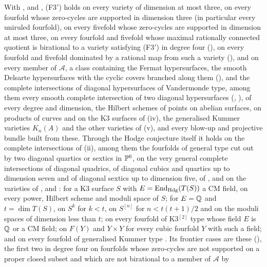 \begin{remark}\label{rem:f3primefrontier}
With ,  and ,
\textup{(F3$'$)} holds on every variety of dimension at most three, on every
fourfold whose zero-cycles are supported in dimension three (in particular
every uniruled fourfold), on every fivefold whose zero-cycles are supported
in dimension at most three, on every fourfold and fivefold whose maximal
rationally connected quotient is birational to a variety satisfying
\textup{(F3$'$)} in degree four (), on every
fourfold and fivefold dominated by a rational map from such a variety
(), and on
every member of $\mathcal{A}$, a class containing the Fermat
hypersurfaces, the smooth Delsarte hypersurfaces with the cyclic covers
branched along them (), and the complete intersections
of diagonal hypersurfaces of Vandermonde type, among them every smooth
complete intersection of two diagonal hypersurfaces (,
), of every degree and dimension, the Hilbert schemes of points on
abelian surfaces, on products of curves and on the K3 surfaces of
(iv), the generalised Kummer varieties $K_{n}(A)$ and the
other varieties of (v), and every blow-up and projective bundle
built from these. Through the Hodge conjecture itself it holds on the
complete intersections of (ii), among them the
fourfolds of general type cut out by two diagonal quartics or sextics in
$\mathbb{P}^{6}$, on the very general complete intersections of diagonal quadrics,
of diagonal cubics and quartics up to dimension seven and of diagonal
sextics up to dimension five, of , and on the
varieties of ,  and
: for a K3 surface $S$ with
$E=\operatorname{End}_{\mathrm{Hdg}}(T(S))$ a CM field, on every power, Hilbert scheme and
moduli space of $S$; for $E=\mathbb{Q}$ and $t=\dim T(S)$, on $S^{k}$ for $k<t$, on
$S^{[n]}$ for $n<t(t+1)/2$ and on the moduli spaces of dimension less than
$t$; on every fourfold of K3$^{[2]}$ type whose field $E$ is $\mathbb{Q}$ or a CM
field; on $F(Y)$ and $Y\times Y$ for every cubic fourfold $Y$ with such a
field; and on every fourfold of generalised Kummer type \cite{FV25}. Its
frontier cases are these (), the first two in
degree four on fourfolds whose zero-cycles are not supported on a proper
closed subset and which are not birational to a member of $\mathcal{A}$ by

\end{remark}
